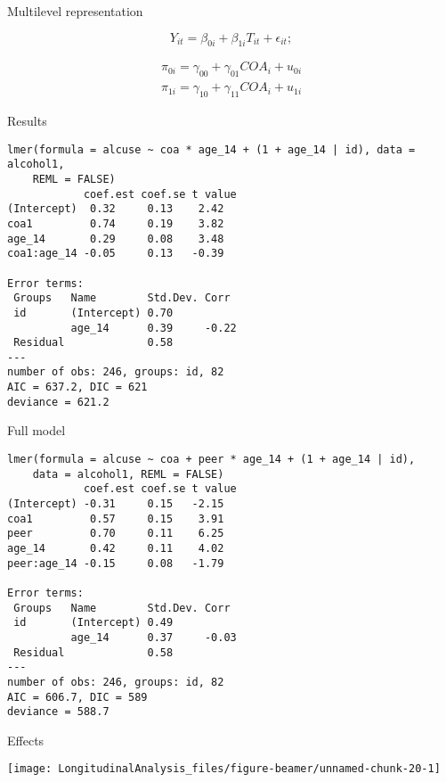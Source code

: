 \documentclass[10pt,ignorenonframetext,]{beamer}
\begin{document}
\begin{frame}{Multilevel representation}

\[
Y_{it} = \beta_{0i} + \beta_{1i} T_{it} + \epsilon_{it};
\]

\[
\begin{gathered}
\pi_{0i} = \gamma_{00} + \gamma_{01} COA_i + u_{0i} \\
\pi_{1i} = \gamma_{10} + \gamma_{11} COA_i + u_{1i}
\end{gathered}
\]

\end{frame}

\begin{frame}[fragile]{Results}

\begin{verbatim}
lmer(formula = alcuse ~ coa * age_14 + (1 + age_14 | id), data = alcohol1, 
    REML = FALSE)
            coef.est coef.se t value
(Intercept)  0.32     0.13    2.42  
coa1         0.74     0.19    3.82  
age_14       0.29     0.08    3.48  
coa1:age_14 -0.05     0.13   -0.39  

Error terms:
 Groups   Name        Std.Dev. Corr  
 id       (Intercept) 0.70           
          age_14      0.39     -0.22 
 Residual             0.58           
---
number of obs: 246, groups: id, 82
AIC = 637.2, DIC = 621
deviance = 621.2 
\end{verbatim}

\end{frame}

\begin{frame}[fragile]{Full model}

\begin{verbatim}
lmer(formula = alcuse ~ coa + peer * age_14 + (1 + age_14 | id), 
    data = alcohol1, REML = FALSE)
            coef.est coef.se t value
(Intercept) -0.31     0.15   -2.15  
coa1         0.57     0.15    3.91  
peer         0.70     0.11    6.25  
age_14       0.42     0.11    4.02  
peer:age_14 -0.15     0.08   -1.79  

Error terms:
 Groups   Name        Std.Dev. Corr  
 id       (Intercept) 0.49           
          age_14      0.37     -0.03 
 Residual             0.58           
---
number of obs: 246, groups: id, 82
AIC = 606.7, DIC = 589
deviance = 588.7 
\end{verbatim}

\end{frame}

\begin{frame}{Effects}

\begin{center}\texttt{[image: LongitudinalAnalysis\_files/figure-beamer/unnamed-chunk-20-1]} \end{center}

\end{frame}
\end{document}
